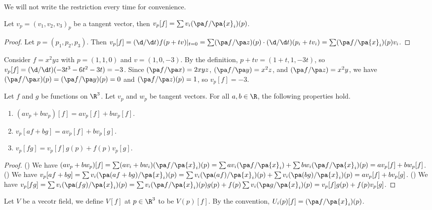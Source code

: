 \documentclass[12pt]{article}
\begin{document}
\begin{remark}
    We will not write the restriction every time for convenience.
\end{remark}
\begin{proposition}
    Let ${v}_{p}={({v}_{1},{v}_{2},{v}_{3})}_{p}$ be a tangent vector, then ${v}_{p}[f]=\sum{v}_{i}(\pa f/\pa{x}_{i})(p)$.
\end{proposition}
\begin{proof}
    Let $p=({p}_{1},{p}_{2},{p}_{3})$. Then ${v}_{p}[f]=(\d/\d t)f(p+tv){\vert}_{t=0}=\sum(\pa f/\pa z)(p)\cdot(\d/\d t)({p}_{i}+t{v}_{i})=\sum(\pa f/\pa{x}_{i})(p){v}_{i}$.
\end{proof}
\begin{example}
    Consider $f={x}^{2}yz$ with $p=(1,1,0)$ and $v=(1,0,-3)$. By the definition, $p+tv=(1+t,1,-3t)$, so ${v}_{p}[f]=(\d/\d t)(-3{t}^{3}-6{t}^{2}-3t)=-3$. Since $(\pa f/\pa x)=2xyz$, $(\pa f/\pa y)={x}^{2}z$, and $(\pa f/\pa z)={x}^{2}y$, we have $(\pa f/\pa x)(p)=(\pa f/\pa y)(p)=0$ and $(\pa f/\pa z)(p)=1$, so ${v}_{p}[f]=-3$.
\end{example}
\begin{proposition}
    Let $f$ and $g$ be functions on ${\R}^{3}$. Let ${v}_{p}$ and ${w}_{p}$ be tangent vectors. For all $a,b\in\R$, the following properties hold.
    \begin{enumerate}
        \item $(a{v}_{p}+b{w}_{p})[f]=a{v}_{p}[f]+b{w}_{p}[f]$.
        \item ${v}_{p}[af+bg]=a{v}_{p}[f]+b{v}_{p}[g]$.
        \item ${v}_{p}[fg]={v}_{p}[f]g(p)+f(p){v}_{p}[g]$.
    \end{enumerate}
\end{proposition}
\begin{proof}
    () We have $(a{v}_{p}+b{w}_{p})[f]=\sum(a{v}_{i}+b{w}_{i})(\pa f/\pa{x}_{i})(p)=\sum a{v}_{i}(\pa f/\pa{x}_{i})+\sum b{w}_{i}(\pa f/\pa{x}_{i})(p)=a{v}_{p}[f]+b{w}_{p}[f]$. () We have ${v}_{p}[af+bg]=\sum{v}_{i}(\pa(af+bg)/\pa{x}_{i})(p)=\sum{v}_{i}(\pa(af)/\pa{x}_{i})(p)+\sum{v}_{i}(\pa(bg)/\pa{x}_{i})(p)=a{v}_{p}[f]+b{v}_{p}[g]$. () We have ${v}_{p}[fg]=\sum{v}_{i}(\pa(fg)/\pa{x}_{i})(p)=\sum{v}_{i}(\pa f/\pa{x}_{i})(p)g(p)+f(p)\sum{v}_{i}(\pa g/\pa{x}_{i})(p)={v}_{p}[f]g(p)+f(p){v}_{p}[g]$.
\end{proof}
\par
Let $V$ be a vecotr field, we define $V[f]$ at $p\in{\R}^{3}$ to be $V(p)[f]$. By the convention, ${U}_{i}(p)[f]=(\pa f/\pa{x}_{i})(p)$.
\end{document}
